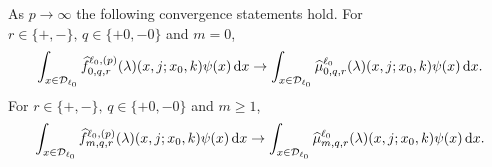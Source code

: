 \begin{thm}\label{thm: a thm2!}
	As \(p\to \infty\) the following convergence statements hold.
	For \(r\in\{+,-\},\, q\in\{+0,-0\}\) and \(m=0\),  
	\begin{align}\int_{x\in\mathcal{D}_{\ell_0}}\widehat f_{0,q,r}^{\ell_0,(p)}(\lambda)(x,j;x_0,k)\psi(x)\, \mathrm{d} x \to \int_{x\in\mathcal{D}_{\ell_0}}\widehat \mu_{0,q,r}^{\ell_0}(\lambda)(x,j;x_0,k)\psi(x)\, \mathrm{d} x.\end{align}
	For \(r\in\{+,-\},\, q\in\{+0,-0\}\) and \(m\geq 1\), 
	\begin{align}\int_{x\in\mathcal{D}_{\ell_0}}\widehat f_{m,q,r}^{\ell_0,(p)}(\lambda)(x,j;x_0,k)\psi(x)\, \mathrm{d} x \to \int_{x\in\mathcal{D}_{\ell_0}}\widehat \mu_{m,q,r}^{\ell_0}(\lambda)(x,j;x_0,k)\psi(x)\, \mathrm{d} x.\label{eqn: thm 22}\end{align}
\end{thm}
